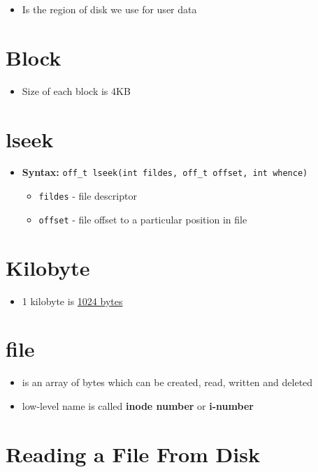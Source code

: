 \documentclass[12pt]{article}
\begin{document}
\begin{itemize}
    \item Is the region of disk we use for user data
\end{itemize}


\section{Block}

\begin{itemize}
    \item Size of each block is 4KB
\end{itemize}

\section{lseek}

\begin{itemize}
    \item \textbf{Syntax:} \texttt{off\_t lseek(int fildes, off\_t offset, int whence)}

    \begin{itemize}
        \item \texttt{fildes} - file descriptor
        \item \texttt{offset} - file offset to a particular position in file
    \end{itemize}
\end{itemize}

\section{Kilobyte}

\begin{itemize}
    \item 1 kilobyte is \underline{1024 bytes}
\end{itemize}

\section{file}
\begin{itemize}
    \item is an array of bytes which can be created, read, written and deleted
    \item low-level name is called \textbf{inode number} or \textbf{i-number}
\end{itemize}
\section{Reading a File From Disk}
\end{document}

